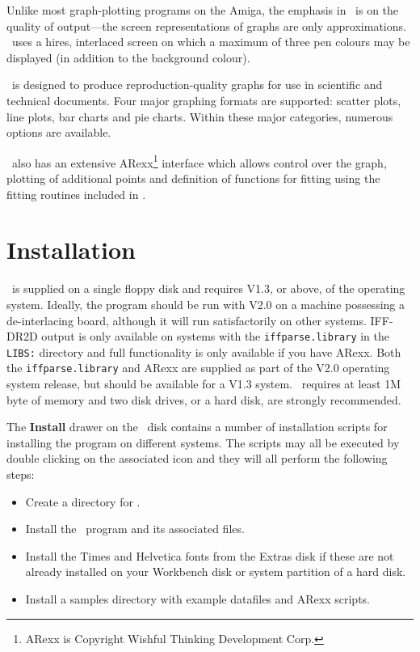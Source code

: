 Unlike most graph-plotting programs on the Amiga, the emphasis in \amplot\ is on 
the quality of output---the screen representations of graphs are only 
approximations. \amplot\ uses a hires, interlaced screen
on which a maximum of three
pen colours may be displayed (in addition to the background colour).

\amplot\ is designed to produce reproduction-quality graphs for use in scientific 
and technical documents. Four major graphing formats are supported: scatter plots, 
line plots, bar charts and pie charts. Within these major categories, numerous 
options are available.

\amplot\ also has an extensive ARexx\footnote{ARexx is Copyright Wishful Thinking 
Development Corp.} interface which allows control over the graph, 
plotting of additional points and definition of functions for fitting using the 
fitting routines included in \amplot.


\section{Installation}
\amplot\ is supplied on a single floppy disk and
requires V1.3, or above, of the operating system.
%
Ideally, the program should be run with V2.0 on a machine 
possessing a de-interlacing board, although it will run satisfactorily on other 
systems. IFF-DR2D output is only available on systems with 
the {\tt iffparse.library}
in the {\tt LIBS:} directory and full functionality is only available if you have 
ARexx.
Both the {\tt iffparse.library} and ARexx are supplied as part of the V2.0 operating 
system release, but should be available for a V1.3 system.
%
\amplot\ requires at least 1M byte of memory and two disk drives, 
or a hard disk, are strongly recommended.

The {\bf Install} drawer on the \amplot\ disk contains a number of installation 
scripts for installing the program on different systems. The scripts may all be 
executed by double clicking on the associated icon and they will all perform the 
following steps:
\begin{itemize}
\item Create a directory for \amplot.
\item Install the \amplot\ program and its associated files.
\item Install the Times and Helvetica fonts from the Extras disk if these are not 
already installed on your Workbench disk or system partition of a hard disk.
\item Install a samples directory with example datafiles and ARexx scripts.
\end{itemize}

